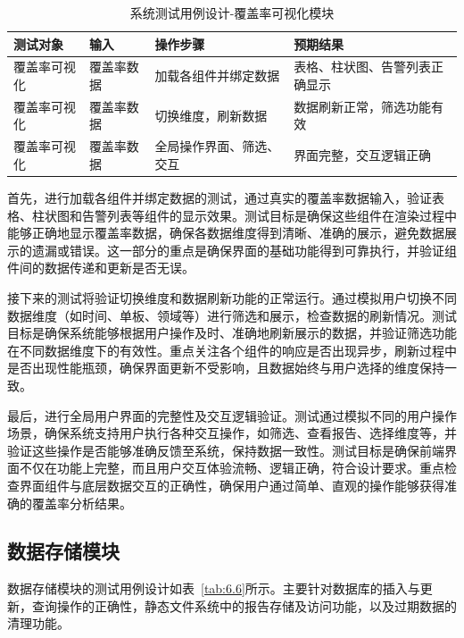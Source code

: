 \begin{table}[ht]
\centering
\caption{系统测试用例设计-覆盖率可视化模块}
\label{tab:6.5}
\begin{tabular}{p{2.5cm}p{2.5cm}p{3.5cm}p{4cm}}
\toprule
\textbf{测试对象} & \textbf{输入} & \textbf{操作步骤} & \textbf{预期结果} \\
\midrule
覆盖率可视化 & 覆盖率数据 & 加载各组件并绑定数据 & 表格、柱状图、告警列表正确显示 \\
覆盖率可视化 & 覆盖率数据 & 切换维度，刷新数据 & 数据刷新正常，筛选功能有效 \\
覆盖率可视化  & 覆盖率数据 & 全局操作界面、筛选、交互 & 界面完整，交互逻辑正确 \\
\bottomrule
\end{tabular}
\end{table}

首先，进行加载各组件并绑定数据的测试，通过真实的覆盖率数据输入，验证表格、柱状图和告警列表等组件的显示效果。测试目标是确保这些组件在渲染过程中能够正确地显示覆盖率数据，确保各数据维度得到清晰、准确的展示，避免数据展示的遗漏或错误。这一部分的重点是确保界面的基础功能得到可靠执行，并验证组件间的数据传递和更新是否无误。

接下来的测试将验证切换维度和数据刷新功能的正常运行。通过模拟用户切换不同数据维度（如时间、单板、领域等）进行筛选和展示，检查数据的刷新情况。测试目标是确保系统能够根据用户操作及时、准确地刷新展示的数据，并验证筛选功能在不同数据维度下的有效性。重点关注各个组件的响应是否出现异步，刷新过程中是否出现性能瓶颈，确保界面更新不受影响，且数据始终与用户选择的维度保持一致。

最后，进行全局用户界面的完整性及交互逻辑验证。测试通过模拟不同的用户操作场景，确保系统支持用户执行各种交互操作，如筛选、查看报告、选择维度等，并验证这些操作是否能够准确反馈至系统，保持数据一致性。测试目标是确保前端界面不仅在功能上完整，而且用户交互体验流畅、逻辑正确，符合设计要求。重点检查界面组件与底层数据交互的正确性，确保用户通过简单、直观的操作能够获得准确的覆盖率分析结果。

\subsection{数据存储模块}
数据存储模块的测试用例设计如表~\ref{tab:6.6}所示。主要针对数据库的插入与更新，查询操作的正确性，静态文件系统中的报告存储及访问功能，以及过期数据的清理功能。

